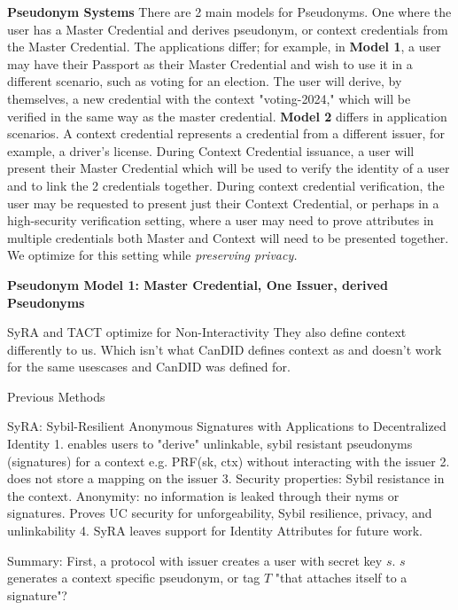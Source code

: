 \noindent \textbf{Pseudonym Systems}
There are 2 main models for Pseudonyms. One where the user has a Master Credential and derives pseudonym, or context credentials from the Master Credential. The applications differ; for example, in \textbf{Model 1}, a user may have their Passport as their Master Credential and wish to use it in a different scenario, such as voting for an election. The user will derive, by themselves, a new credential with the context "voting-2024," which will be verified in the same way as the master credential.
\textbf{Model 2} differs in application scenarios. A context credential represents a credential from a different issuer, for example, a driver's license. During Context Credential issuance, a user will present their Master Credential which will be used to verify the identity of a user and to link the 2 credentials together. During context credential verification, the user may be requested to present just their Context Credential, or perhaps in a high-security verification setting, where a user may need to prove attributes in multiple credentials both Master and Context will need to be presented together. We optimize for this setting while \emph{preserving privacy.}



\noindent \textbf{Pseudonym Model 1: Master Credential, One Issuer, derived Pseudonyms}

SyRA and TACT optimize for Non-Interactivity
They also define context differently to us. Which isn't what CanDID defines context as and doesn't work for the same usescases and CanDID was defined for. 

Previous Methods

\noindent SyRA: Sybil-Resilient Anonymous Signatures  with Applications to Decentralized Identity \cite{crites_syra_2024}
1. enables users to "derive" unlinkable, sybil resistant pseudonyms (signatures) for a context e.g. PRF(sk, ctx) without interacting with the issuer
2. does not store a mapping on the issuer
3. Security properties: Sybil resistance in the context. Anonymity: no information is leaked through their nyms or signatures. Proves UC security for unforgeability, Sybil resilience, privacy, and unlinkability
4. SyRA leaves support for Identity Attributes for future work.

Summary: First, a protocol with issuer creates a user with secret key $s$. $s$ generates a context specific pseudonym, or tag $T$ "that attaches itself to a signature"?

